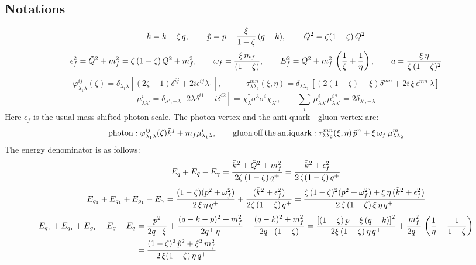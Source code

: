 \documentclass[9pt]{article}
\numberwithin{equation}{section}
\begin{document}
\subsection{Notations}
$$\Tilde{k} = k - \zeta\,q,\hspace{2em}\, \Tilde{p} = p - \frac{\xi}{1-\zeta}\, (q-k),\hspace{2em}\,\Tilde{Q}^{2} = \zeta(1-\zeta)\, Q^{2}$$
$$\epsilon^{2}_{f} = \Tilde{Q}^{2}+ m^{2}_{f} = \zeta\, (1-\zeta)\,Q^{2} +m^{2}_{f}, \hspace{2em} \omega_{f} = \frac{\xi\,m_{f}}{(1-\zeta)}, \hspace{2em} E^{2}_{f} = Q^{2} +m^{2}_{f}\,\left(\frac{1}{\zeta} + \frac{1}{\eta}\right),\hspace{2em} a = \frac{\xi\,\eta}{\zeta\,(1-\zeta)^{2}}$$
$$\varphi^{ij}_{\lambda_{1}\lambda}(\zeta) = \delta_{\lambda_{1}\lambda}\left[(2\zeta -1)\delta^{ij} +2i\epsilon^{ij}\lambda_{1}\right],\hspace{3em} \tau^{mn}_{\lambda \lambda_{2}}(\xi,\eta) = \delta_{\lambda \lambda_{2}}\,\left[(2(1-\zeta)-\xi)\delta^{mn}+2i\,\xi\,\epsilon^{mn}\,\lambda\right] $$
$$\mu^{i}_{\lambda\lambda'} = \delta_{\lambda',-\lambda}\left[2\lambda\delta^{i1} - i\delta^{i2}\right] = \chi^{\dagger}_{\lambda}\sigma^{3}\sigma^{i}\chi_{\lambda'},\hspace{2em} \sum_{i}\,\mu^{i}_{\lambda\lambda'}\mu^{i*}_{\lambda\lambda'} = 2\delta_{\lambda',-\lambda}$$
Here $\epsilon_{f}$ is the usual mass shifted photon scale. The photon vertex and the anti quark - gluon vertex are:
$$\mathrm{photon}: \varphi^{ij}_{\lambda_{1}\lambda}(\zeta)\Tilde{k}^{j} + m_{f}\mu^{i}_{\lambda_{1}\lambda},\hspace{2em} \mathrm{gluon\, off\, the\, antiquark}: \tau^{mn}_{\lambda\lambda_{2}}(\xi,\eta)\, \Tilde{p}^{n} + \xi\, \omega_{f}\,\mu^{m}_{\lambda\lambda_{2}}$$
The energy denominator is as follows:
$$E_{q}+E_{\Bar{q}}-E_{\gamma} = \frac{\Tilde{k}^{2}+\Tilde{Q}^{2}+m^{2}_{f}}{2\zeta\, (1-\zeta)\,q^{+}} = \frac{\Tilde{k}^{2}+\epsilon^{2}_{f}}{2\,\zeta(1-\zeta)\,q^{+}}$$
$$E_{q_{1}}+E_{\Bar{q}_{1}}+E_{g_{1}}-E_{\gamma} = \frac{(1-\zeta) (\Tilde{p}^{2}+\omega^{2}_{f})}{2\,\xi\, \eta\,q^{+}} + \frac{(\Tilde{k}^{2}+\epsilon_{f}^{2})}{2\zeta\,(1-\zeta)\,q^{+}} = \frac{\zeta\,(1-\zeta)^{2} (\Tilde{p}^{2}+\omega^{2}_{f}) + \xi\,\eta\, (\Tilde{k}^{2}+\epsilon^{2}_{f})}{2\,\zeta\,(1-\zeta)\,\xi\,\eta\,q^{+}}$$
\begin{align}
    E_{q_{1}}+E_{\Bar{q}_{1}}+E_{g_{1}}-E_{q}-E_{\Bar{q}} & = \frac{p^{2}}{2q^{+}\,\xi}+\frac{(q-k-p)^{2}+m^{2}_{f}}{2q^{+}\, \eta}-\frac{(q-k)^{2}+m^{2}_{f}}{2q^{+}\, (1-\zeta)} = \frac{\left[(1-\zeta)\,p - \xi\,(q-k)\right]^{2}}{2\xi\,(1-\zeta)\,\eta\,q^{+}} +\frac{m^{2}_{f}}{2q^{+}}\,\left(\frac{1}{\eta} - \frac{1}{1-\zeta}\right)\notag \\ & = \frac{(1-\zeta)^{2}\,\Tilde{p}^{2} + \xi^{2}\,m^{2}_{f}}{2\,\xi(1-\zeta)\,\eta\,q^{+}}
\end{align}
\end{document}
